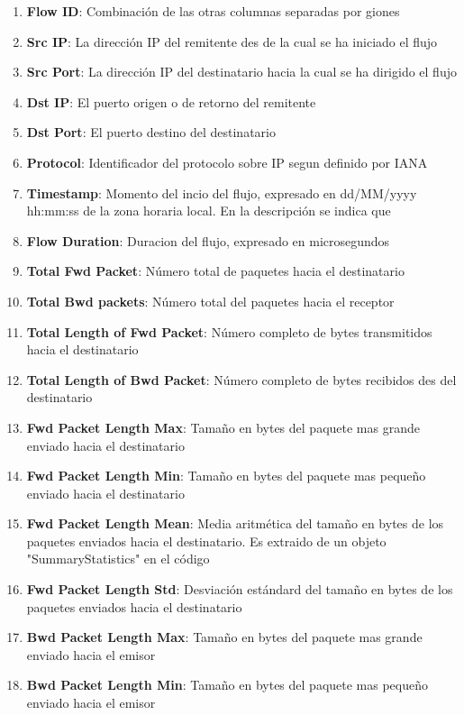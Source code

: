 \begin{enumerate}
    \item \textbf{Flow ID}: Combinación de las otras columnas separadas por giones
    \item \textbf{Src IP}: La dirección IP del remitente des de la cual se ha iniciado el flujo
    \item \textbf{Src Port}: La dirección IP del destinatario hacia la cual se ha dirigido el flujo
    \item \textbf{Dst IP}: El puerto origen o de retorno del remitente
    \item \textbf{Dst Port}: El puerto destino del destinatario
    \item \textbf{Protocol}: Identificador del protocolo sobre IP segun definido por IANA \cite{ipprotocolnumbers}
    \item \textbf{Timestamp}: Momento del incio del flujo, expresado en dd/MM/yyyy hh:mm:ss de la zona horaria local. En la descripción se indica que 
    \item \textbf{Flow Duration}: Duracion del flujo, expresado en microsegundos
    \item \textbf{Total Fwd Packet}: Número total de paquetes hacia el destinatario
    \item \textbf{Total Bwd packets}: Número total del paquetes hacia el receptor
    \item \textbf{Total Length of Fwd Packet}: Número completo de bytes transmitidos hacia el destinatario
    \item \textbf{Total Length of Bwd Packet}: Número completo de bytes recibidos des del destinatario
    \item \textbf{Fwd Packet Length Max}: Tamaño en bytes del paquete mas grande enviado hacia el destinatario
    \item \textbf{Fwd Packet Length Min}: Tamaño en bytes del paquete mas pequeño enviado hacia el destinatario
    \item \textbf{Fwd Packet Length Mean}: Media aritmética del tamaño en bytes de los paquetes enviados hacia el destinatario. Es extraido de un objeto "SummaryStatistics" en el código
    \item \textbf{Fwd Packet Length Std}: Desviación estándard del tamaño en bytes de los paquetes enviados hacia el destinatario
    \item \textbf{Bwd Packet Length Max}: Tamaño en bytes del paquete mas grande enviado hacia el emisor
    \item \textbf{Bwd Packet Length Min}: Tamaño en bytes del paquete mas pequeño enviado hacia el emisor

\end{enumerate}
